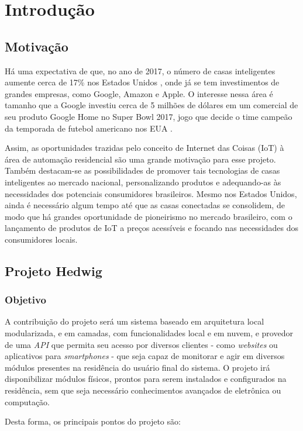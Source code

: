 \chapter{Introdução}

\section{Motivação}
Há uma expectativa de que, no ano de 2017, o número de casas inteligentes aumente cerca de 17\% nos Estados Unidos \cite{mckinseyReport}, onde já se tem investimentos de grandes empresas, como Google, Amazon e Apple. O interesse nessa área é tamanho que a Google investiu cerca de 5 milhões de dólares em um comercial de seu produto Google Home no Super Bowl 2017, jogo que decide o time campeão da temporada de futebol americano nos EUA \cite{kennemer}.

Assim, as oportunidades trazidas pelo conceito de Internet das Coisas (IoT) à área de automação residencial são uma grande motivação para esse projeto. Também destacam-se as possibilidades de promover tais tecnologias de casas inteligentes ao mercado nacional, personalizando produtos e adequando-as às necessidades dos potenciais consumidores brasileiros. Mesmo nos Estados Unidos, ainda é necessário algum tempo até que as casas conectadas se consolidem, de modo que há grandes oportunidade de pioneirismo no mercado brasileiro, com o lançamento de produtos de IoT a preços acessíveis e focando nas necessidades dos consumidores locais.

\section{Projeto Hedwig}

\subsection{Objetivo}
A contribuição do projeto será um sistema baseado em arquitetura local modularizada, e em camadas, com funcionalidades local e em nuvem, e provedor de uma \textit{API} que permita seu acesso por diversos clientes - como \textit{websites} ou aplicativos para \textit{smartphones} - que seja capaz de monitorar e agir em diversos módulos presentes na residência do usuário final do sistema. O projeto irá disponibilizar módulos físicos, prontos para serem instalados e configurados na residência, sem que seja necessário conhecimentos avançados de eletrônica ou computação.

Desta forma, os principais pontos do projeto são:

